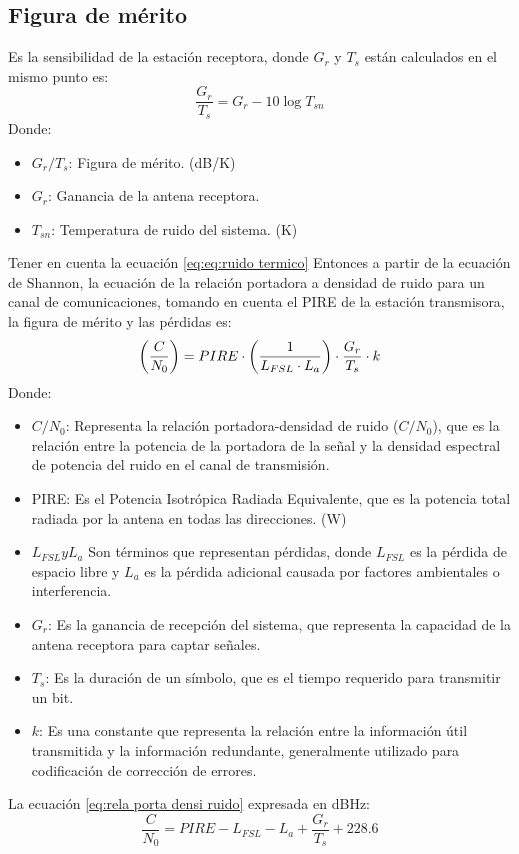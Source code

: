 \documentclass[
	12pt, %
	fleqn, %
	a4paper, %
	oneside, %
]{LegrandOrangeBook}
\begin{document}
\subsection{Figura de mérito}
Es la sensibilidad de la estación receptora, donde $G_r$ y $T_s$ están calculados en el mismo punto es:
\begin{equation}
\frac{G_r}{T_s}=G_r-10\log T_{sn}
\end{equation}
Donde:
\begin{itemize}
\item $G_r/T_s$: Figura de mérito. (dB/K)
\item $G_r$: Ganancia de la antena receptora.
\item $T_{sn}$: Temperatura de ruido del sistema. (K)
\end{itemize}
Tener en cuenta la ecuación \ref{eq:eq:ruido termico}
Entonces a partir de la ecuación de Shannon, la ecuación de la relación
portadora a densidad de ruido para un canal de comunicaciones, tomando en cuenta el PIRE de la estación transmisora, la figura de mérito y las pérdidas es:
\begin{equation}
\left(\frac{C}{N_0}\right)=PIRE\cdot\left(\frac{1}{L_{FSL}\cdot L_a}\right)\cdot \frac{G_r}{T_s}\cdot k
\label{eq:rela porta densi ruido}
\end{equation}
Donde:
\begin{itemize}
\item $C/N_0$: Representa la relación portadora-densidad de ruido ($C/N_0$), que es la relación entre la potencia de la portadora de la señal y la densidad espectral de potencia del ruido en el canal de transmisión.
\item PIRE: Es el Potencia Isotrópica Radiada Equivalente, que es la potencia total radiada por la antena en todas las direcciones. (W)
\item $L_{FSL} y L_a$ Son términos que representan pérdidas, donde 
$L_{FSL}$ es la pérdida de espacio libre y $L_a$ es la pérdida adicional causada por factores ambientales o interferencia.
\item $G_r$: Es la ganancia de recepción del sistema, que representa la capacidad de la antena receptora para captar señales.
\item $T_s$: Es la duración de un símbolo, que es el tiempo requerido para transmitir un bit.
\item $k$: Es una constante que representa la relación entre la información útil transmitida y la información redundante, generalmente utilizado para codificación de corrección de errores.
\end{itemize}
La ecuación \ref{eq:rela porta densi ruido} expresada en dBHz:
\begin{equation}
\frac{C}{N_0}=PIRE-L_{FSL}-L_a+\frac{G_r}{T_s}+228.6
\end{equation}
\end{document}
